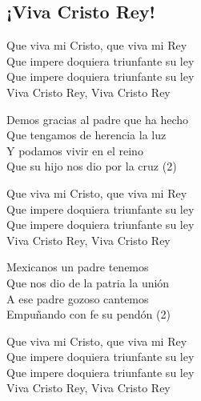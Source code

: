 \subsection{¡Viva Cristo Rey!}

\begin{center}

{\Large
Que viva mi Cristo, que viva mi Rey\\
Que impere doquiera triunfante su ley\\
Que impere doquiera triunfante su ley\\
Viva Cristo Rey, Viva Cristo Rey\\
\vspace{2em}

Demos gracias al padre que ha hecho\\
Que tengamos de herencia la luz\\
Y podamos vivir en el reino\\
Que su hijo nos dio por la cruz (2)

Que viva mi Cristo, que viva mi Rey\\
Que impere doquiera triunfante su ley\\
Que impere doquiera triunfante su ley\\
Viva Cristo Rey, Viva Cristo Rey\\
\vspace{2em}

Mexicanos un padre tenemos \\
Que nos dio de la patria la unión\\
A ese padre gozoso cantemos\\
Empuñando con fe su pendón (2)\\
\vspace{2em}

Que viva mi Cristo, que viva mi Rey\\
Que impere doquiera triunfante su ley\\
Que impere doquiera triunfante su ley\\
Viva Cristo Rey, Viva Cristo Rey\\
}



\end{center}

